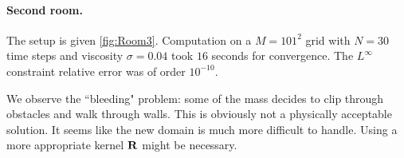 \documentclass[../report.tex]{subfiles}
\begin{document}
\begin{comment}
\paragraph{Second room.} The setup is given in \cref{fig:NMarg2DomainPot}: the new domain is $\Omega = [0,1] \times [0,2]$ and consists of two rooms separated by a long but narrow hallway with a singular choke point. We use a viscosity parameter $\sigma = 0.1$. Results are given \cref{fig:NMargEx2}. The constraints and costs are identical as before. The grid size was $M = 51 \times 101$, and the result was obtained with $150$ Sinkhorn iterations, which took about $118$ seconds on a 2.6GHz Intel Core i7 processor. The final relative $L^\infty$ error on the $\rho_0$ constraint was of order $10^{-4}$. However, the congestion plot \cref{fig:Room2CongestPlot} suggests that the algorithm hasn't exactly converged.
\end{comment}

\begin{comment}
\begin{figure}[h]
	\centering
	\begin{subfigure}[b]{.3\linewidth}
		\texttt{[image: ../project/images/multimarg\_room2/room\_setup.pdf]}
	\end{subfigure}~
	\begin{subfigure}[b]{.39\linewidth}
		\texttt{[image: ../project/images/multimarg\_room2/room\_potential.pdf]}
	\end{subfigure}
	\caption{Domain, initial and target agent distributions, and associated potential $\Psi$ for the multi-marginal problem. The initial distribution $\rho_0$ is in blue, the objective is in red.}\label{fig:NMarg2DomainPot}
\end{figure}
\end{comment}



\paragraph{Second room.} The setup is given \cref{fig:Room3}. Computation on a $M=101^2$ grid with $N=30$ time steps and viscosity $\sigma = 0.04$ took $16$ seconds for convergence. The $L^\infty$ constraint relative error was of order $10^{-10}$.

We observe the ``bleeding" problem: some of the mass decides to clip through obstacles and walk through walls. This is obviously not a physically acceptable solution. It seems like the new domain is much more difficult to handle. Using a more appropriate kernel $\mathbf{R}$ might be necessary.
\end{document}

